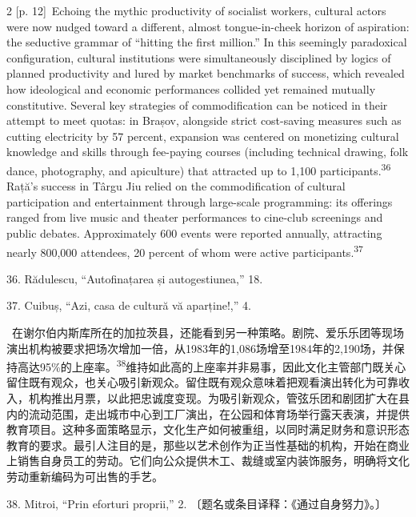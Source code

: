 \documentclass[10pt,a4paper]{article}
\begin{document}
\begin{paracol}{2}
\switchcolumn
{\scriptsize\color{gray} [p. 12]}\ Echoing the mythic productivity of socialist workers, cultural actors were now nudged toward a different, almost tongue-in-cheek horizon of aspiration: the seductive grammar of “hitting the first million.” In this seemingly paradoxical configuration, cultural institutions were simultaneously disciplined by logics of planned productivity and lured by market benchmarks of success, which revealed how ideological and economic performances collided yet remained mutually constitutive. Several key strategies of commodification can be noticed in their attempt to meet quotas: in Brașov, alongside strict cost-saving measures such as cutting electricity by 57 percent, expansion was centered on monetizing cultural knowledge and skills through fee-paying courses (including technical drawing, folk dance, photography, and apiculture) that attracted up to 1,100 participants.\nobreak\textsuperscript{36} Rață’s success in Târgu Jiu relied on the commodification of cultural participation and entertainment through large-scale programming: its offerings ranged from live music and theater performances to cine-club screenings and public debates. Approximately 600 events were reported annually, attracting nearly 800,000 attendees, 20 percent of whom were active participants.\nobreak\textsuperscript{37}\par{\small 36. Rădulescu, “Autofinațarea și autogestiunea,” 18.\par}{\small 37. Cuibuș, “Azi, casa de cultură vă aparține!,” 4.\par}
\switchcolumn*
{\scriptsize\color{gray} [p. 12]}\ 在谢尔伯内斯库所在的加拉茨县，还能看到另一种策略。剧院、爱乐乐团等现场演出机构被要求把场次增加一倍，从1983年的1,086场增至1984年的2,190场，并保持高达95\%的上座\mbox{率。\textsuperscript{38}}维持如此高的上座率并非易事，因此文化主管部门既关心留住既有观众，也关心吸引新观众。留住既有观众意味着把观看演出转化为可靠收入，机构推出月票，以此把忠诚度变现。为吸引新观众，管弦乐团和剧团扩大在县内的流动范围，走出城市中心到工厂演出，在公园和体育场举行露天表演，并提供教育项目。这种多面策略显示，文化生产如何被重组，以同时满足财务和意识形态教育的要求。最引人注目的是，那些以艺术创作为正当性基础的机构，开始在商业上销售自身员工的劳动。它们向公众提供木工、裁缝或室内装饰服务，明确将文化劳动重新编码为可出售的手艺。\par{\small 38. Mitroi, “Prin eforturi proprii,” 2. 〔题名或条目译释：《通过自身努力》。〕\par}
\switchcolumn

\end{paracol}
\end{document}
